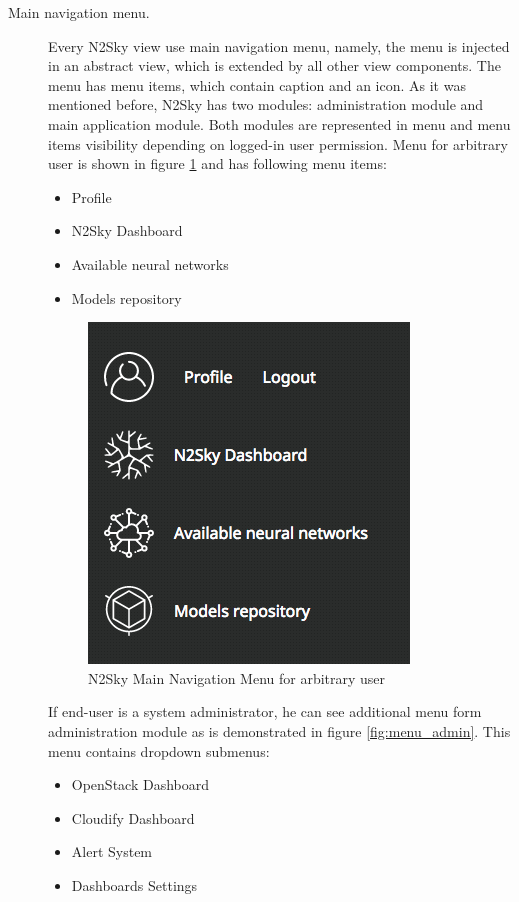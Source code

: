 \begin{description}
\item[Main navigation menu.] Every N2Sky view use main navigation menu, namely, the menu is injected in an abstract view, which is extended by all other view components. The menu has menu items, which contain caption and an icon. As it was mentioned before, N2Sky has two modules: administration module and main application module. Both modules are represented in menu and menu items visibility depending on logged-in user permission. 
Menu for arbitrary user is shown in figure \ref{fig:menu_user}  and has following menu items:

\begin{itemize}
\item Profile 
\item N2Sky Dashboard
\item Available neural networks
\item Models repository
\end{itemize}

 
 \begin{figure}[H]
\begin{center}
  \includegraphics[scale=0.5]{components/3/components/menu_user.png}
  \caption{N2Sky Main Navigation Menu for arbitrary user}
  \label{fig:menu_user}
\end{center}
\end{figure}

If end-user is a system administrator, he can see additional menu form administration module as is demonstrated in figure \ref{fig:menu_admin}. This menu contains dropdown submenus: 

\begin{itemize}
\item OpenStack Dashboard
\item Cloudify Dashboard
\item Alert System
\item Dashboards Settings
\end{itemize}



\end{description}
